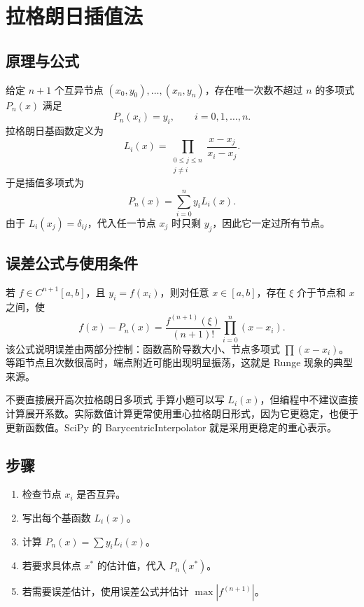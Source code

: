 \documentclass[11pt,a4paper]{ctexart}
\begin{document}
\newpage
\section{拉格朗日插值法}

\subsection{原理与公式}

给定 $n+1$ 个互异节点 $(x_0,y_0),\ldots,(x_n,y_n)$，存在唯一次数不超过 $n$ 的多项式 $P_n(x)$ 满足
\[
P_n(x_i)=y_i,\qquad i=0,1,\ldots,n.
\]
拉格朗日基函数定义为
\[
  L_i(x)=\prod_{\substack{0\le j\le n\\j\ne i}}\frac{x-x_j}{x_i-x_j}.
\]
于是插值多项式为
\[
  P_n(x)=\sum_{i=0}^{n}y_i L_i(x).
\]
由于 $L_i(x_j)=\delta_{ij}$，代入任一节点 $x_j$ 时只剩 $y_j$，因此它一定过所有节点。

\subsection{误差公式与使用条件}

若 $f\in C^{n+1}[a,b]$，且 $y_i=f(x_i)$，则对任意 $x\in[a,b]$，存在 $\xi$ 介于节点和 $x$ 之间，使
\[
  f(x)-P_n(x)=\frac{f^{(n+1)}(\xi)}{(n+1)!}\prod_{i=0}^{n}(x-x_i).
\]
该公式说明误差由两部分控制：函数高阶导数大小、节点多项式 $\prod(x-x_i)$。等距节点且次数很高时，端点附近可能出现明显振荡，这就是 Runge 现象的典型来源。

\begin{warnbox}{不要直接展开高次拉格朗日多项式}
手算小题可以写 $L_i(x)$，但编程中不建议直接计算展开系数。实际数值计算更常使用重心拉格朗日形式，因为它更稳定，也便于更新函数值。SciPy 的 BarycentricInterpolator 就是采用更稳定的重心表示。
\end{warnbox}

\subsection{步骤}
\begin{enumerate}[label=\arabic*)]
  \item 检查节点 $x_i$ 是否互异。
  \item 写出每个基函数 $L_i(x)$。
  \item 计算 $P_n(x)=\sum y_iL_i(x)$。
  \item 若要求具体点 $x^*$ 的估计值，代入 $P_n(x^*)$。
  \item 若需要误差估计，使用误差公式并估计 $\max |f^{(n+1)}|$。
\end{enumerate}
\end{document}
